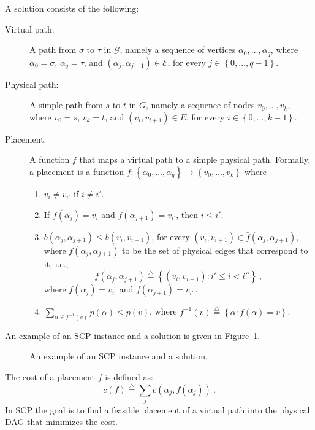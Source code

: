 \documentclass[runningheads]{llncs}
\newcommand{\eqdf}{\stackrel{\scriptscriptstyle \triangle}{=}}
\newcommand{\set}[1]{\left\{ #1 \right\}}
\newcommand{\scp}{\textsc{SCP}\xspace}
\newcommand{\calE}{\mathcal{E}}
\newcommand{\calG}{\mathcal{G}}
\begin{document}
A solution consists of the following:
\begin{description}
\item[Virtual path:] A path from $\sigma$ to $\tau$ in $\calG$, namely
  a sequence of vertices $\alpha_0,\ldots,\alpha_q$, where
  $\alpha_0 = \sigma$, $\alpha_q = \tau$, and
  $(\alpha_j,\alpha_{j+1}) \in \calE$, for every $j \in
  \set{0,\ldots,q-1}$.

\medskip
  
\item[Physical path:] A simple path from $s$ to $t$ in $G$, namely a
  sequence of nodes $v_0,\ldots,v_k$, where $v_0 = s$, $v_k = t$, and
  $(v_i,v_{i+1}) \in E$, for every $i \in \set{0,\ldots,k-1}$.

\medskip
  
\item[Placement:] A function $f$ that maps a virtual path to a simple
  physical path.  Formally, a placement is a function $f:
  \set{\alpha_0,\ldots,\alpha_q} \to \set{v_0,\ldots,v_k}$ where 
\begin{enumerate}
\item $v_i \neq v_{i'}$ if $i \neq i'$.    
\item If $f(\alpha_j) = v_i$ and $f(\alpha_{j+1}) = v_{i'}$, then $i
  \leq i'$.
\item $b(\alpha_j,\alpha_{j+1}) \leq b(v_i,v_{i+1})$, for every
  $(v_i,v_{i+1}) \in \bar{f}(\alpha_j,\alpha_{j+1})$, where
  $\bar{f}(\alpha_j,\alpha_{j+1})$ to be the set of physical edges
  that correspond to it, i.e.,
\[
\bar{f}(\alpha_j,\alpha_{j+1}) \eqdf \set{(v_i,v_{i+1}) : i' \leq i < i''}
~,
\]
  where $f(\alpha_j) = v_{i'}$ and $f(\alpha_{j+1}) = v_{i''}$.

\item $\sum_{\alpha \in f^{-1}(v)} p(\alpha) \leq p(v)$, where
  $f^{-1}(v) \eqdf \set{\alpha : f(\alpha) = v}$.
 
\end{enumerate}
\end{description}

An example of an \scp instance and a solution is given in
Figure~\ref{fig:solution}.

\begin{figure}[t]
\centering
\scalebox{0.85}{

}
\caption{An example of an \scp instance and a solution.}
\label{fig:solution}
\end{figure}

The cost of a placement $f$ is defined as:
\[
c(f) \eqdf \sum_j c(\alpha_j,f(\alpha_j))
~.
\]
In \scp the goal is to find a feasible placement of a virtual path
into the physical DAG that minimizes the cost.
\end{document}
